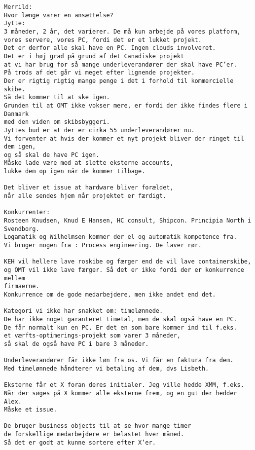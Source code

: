 \begin{verbatim}
Merrild:
Hvor længe varer en ansættelse?
Jytte:
3 måneder, 2 år, det varierer. De må kun arbejde på vores platform, 
vores servere, vores PC, fordi det er et lukket projekt.
Det er derfor alle skal have en PC. Ingen clouds involveret.
Det er i høj grad på grund af det Canadiske projekt
at vi har brug for så mange underleverandører der skal have PC’er. 
På trods af det går vi meget efter lignende projekter.
Der er rigtig rigtig mange penge i det i forhold til kommercielle skibe.
Så det kommer til at ske igen.
Grunden til at OMT ikke vokser mere, er fordi der ikke findes flere i Danmark
med den viden om skibsbyggeri. 
Jyttes bud er at der er cirka 55 underleverandører nu.
Vi forventer at hvis der kommer et nyt projekt bliver der ringet til dem igen,
og så skal de have PC igen.
Måske lade være med at slette eksterne accounts,
lukke dem op igen når de kommer tilbage.

Det bliver et issue at hardware bliver forældet,
når alle sendes hjem når projektet er færdigt.

Konkurrenter:
Rosteen Knudsen, Knud E Hansen, HC consult, Shipcon. Principia North i Svendborg. 
Logamatik og Wilhelmsen kommer der el og automatik kompetence fra.
Vi bruger nogen fra : Process engineering. De laver rør.

KEH vil hellere lave roskibe og færger end de vil lave containerskibe,
og OMT vil ikke lave færger. Så det er ikke fordi der er konkurrence mellem
firmaerne. 
Konkurrence om de gode medarbejdere, men ikke andet end det.

Kategori vi ikke har snakket om: timelønnede.
De har ikke noget garanteret timetal, men de skal også have en PC.
De får normalt kun en PC. Er det en som bare kommer ind til f.eks.
et værfts-optimerings-projekt som varer 3 måneder,
så skal de også have PC i bare 3 måneder.

Underleverandører får ikke løn fra os. Vi får en faktura fra dem. 
Med timelønnede håndterer vi betaling af dem, dvs Lisbeth.

Eksterne får et X foran deres initialer. Jeg ville hedde XMM, f.eks.
Når der søges på X kommer alle eksterne frem, og en gut der hedder Alex.
Måske et issue.

De bruger business objects til at se hvor mange timer
de forskellige medarbejdere er belastet hver måned.
Så det er godt at kunne sortere efter X’er.
\end{verbatim}